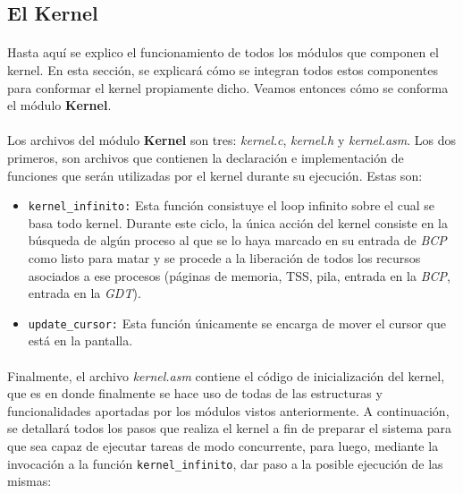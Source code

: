 \documentclass[11pt, a4paper]{article}
\begin{document}
\subsection{El Kernel}
\label{kernel}	
	\paragraph{}
	Hasta aquí se explico el funcionamiento de todos los módulos que componen el kernel. En esta sección, se explicará cómo se integran todos estos componentes para conformar el kernel propiamente dicho. Veamos entonces cómo se conforma el módulo \textbf{Kernel}.
	
	\paragraph{} 
	Los archivos del módulo \textbf{Kernel} son tres: \textit{kernel.c}, \textit{kernel.h} y \textit{kernel.asm}. Los dos primeros, son archivos que contienen la declaración e implementación de funciones que serán utilizadas por el kernel durante su ejecución. Estas son:
	\begin{itemize}
		\item \texttt{kernel\_infinito:} Esta función consistuye el loop infinito sobre el cual se basa todo kernel. Durante este ciclo, la única acción del kernel consiste en la búsqueda de algún proceso al que se lo haya marcado en su entrada de \textit{BCP} como listo para matar y se procede a la liberación de todos los recursos asociados a ese procesos (páginas de memoria, TSS, pila, entrada en la \textit{BCP}, entrada en la \textit{GDT}).
		\item \texttt{update\_cursor:} Esta función únicamente se encarga de mover el cursor que está en la pantalla.
	\end{itemize}
	
	\paragraph{}
	Finalmente, el archivo \textit{kernel.asm} contiene el código de inicialización del kernel, que es en donde finalmente se hace uso de todas de las estructuras y funcionalidades aportadas por los módulos vistos anteriormente. A continuación, se detallará todos los pasos que realiza el kernel a fin de preparar el sistema para que sea capaz de ejecutar tareas de modo concurrente, para luego, mediante la invocación a la función \texttt{kernel\_infinito}, dar paso a la posible ejecución de las mismas:
	
\end{document}
